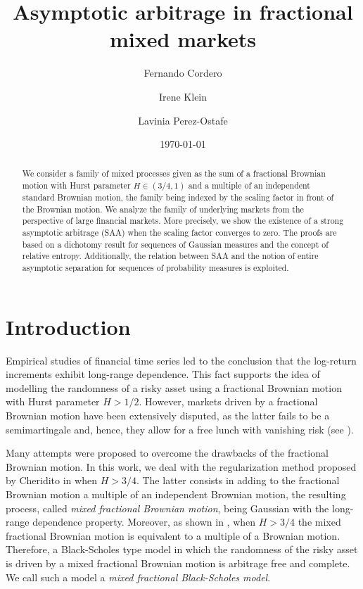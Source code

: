 \documentclass[reqno,a4paper]{amsart}
\title[Mixed markets]{Asymptotic arbitrage in fractional mixed markets}
\author{Fernando Cordero}
\author{Irene Klein}
\author{Lavinia Perez-Ostafe}
\date{\today}
\theoremstyle{plain}
\theoremstyle{definition}
\theoremstyle{plain}
\theoremstyle{plain}
\theoremstyle{plain}
\begin{document}
\subjclass[2010]{}

\begin{abstract}
 We consider a family of mixed processes given as the sum of a fractional Brownian motion with Hurst parameter $H\in(3/4,1)$ and a multiple of an independent standard Brownian motion, the family being indexed by the scaling factor in front of the Brownian motion. We analyze the family of underlying markets from the perspective of large financial markets. More precisely, we show the existence of a strong asymptotic arbitrage (SAA) when the scaling factor converges to zero. The proofs are based on a dichotomy result for sequences of Gaussian measures and the concept of relative entropy. Additionally, the relation between SAA and the notion of entire asymptotic separation for sequences of probability measures is exploited.
\end{abstract}
\maketitle

\section{Introduction}
Empirical studies of financial time series led to the conclusion that the log-return increments exhibit long-range dependence. This fact supports the idea of modelling the randomness of a risky asset using a fractional Brownian motion with Hurst parameter $H>1/2$. However, markets driven by a fractional Brownian motion have been extensively disputed, as the latter fails to be a semimartingale and, hence, they allow for a free lunch with vanishing risk (see \cite{G:R:S:2008}). 

Many attempts were proposed to overcome the drawbacks of the fractional Brownian motion. In this work, we deal with the regularization method proposed by Cheridito in \cite{Ch,Ch1} when $H>3/4$. The latter consists in adding to the fractional Brownian motion a multiple of an independent Brownian motion, the resulting process, called \textit{mixed fractional Brownian motion}, being Gaussian with the long-range dependence property. Moreover, as shown in \cite{Ch,Ch1}, when $H>3/4$ the mixed fractional Brownian motion is equivalent to a multiple of a Brownian motion. Therefore, a Black-Scholes type model in which the randomness of the risky asset is driven by a mixed fractional Brownian motion is arbitrage free and complete. We call such a model a \textit{mixed fractional Black-Scholes model}. 
\end{document}
